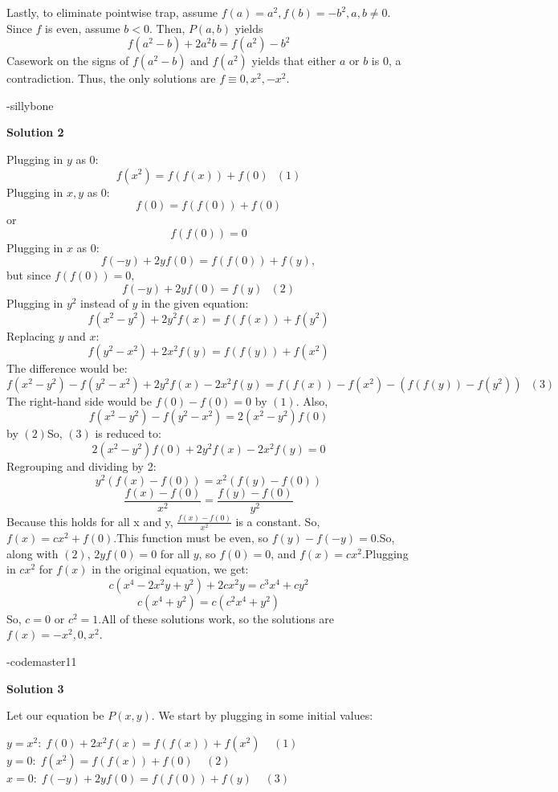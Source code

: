 \begin{enumerate}
 Lastly, to eliminate pointwise trap, assume $f(a)=a^2, f(b)=-b^2, a, b \neq  0$. Since $f$ is even, assume $b< 0$. Then, $P(a, b)$ yields 
 \[f(a^2-b)+2a^2b=f(a^2)-b^2\] Casework on the signs of $f(a^2-b)$ and $f(a^2)$ yields that either $a$ or $b$ is 0, a contradiction. Thus, the only solutions are $\boxed{f\equiv 0, x^2, -x^2}$.

 -sillybone

 



\textbf{Solution 2}

Plugging in $y$ as $0:$\begin{equation}f(x^2)=f(f(x))+f(0) \text{ } (1)\end{equation}Plugging in $x, y$ as $0:$
 \[f(0)=f(f(0))+f(0)\]or
 \[f(f(0))=0\]Plugging in $x$ as $0:$
 \[f(-y)+2yf(0)=f(f(0))+f(y),\]but since $f(f(0))=0,$\begin{equation}f(-y)+2yf(0)=f(y) \text{ } (2)\end{equation}Plugging in $y^2$ instead of $y$ in the given equation:
 \[f(x^2-y^2)+2y^2f(x)=f(f(x))+f(y^2)\]Replacing $y$ and $x$:
 \[f(y^2-x^2)+2x^2f(y)=f(f(y))+f(x^2)\]The difference would be:\begin{equation}f(x^2-y^2)-f(y^2-x^2)+2y^2f(x)-2x^2f(y)=f(f(x))-f(x^2)-(f(f(y))-f(y^2)) \text{ } (3)\end{equation}The right-hand side would be $f(0)-f(0)=0$ by $(1).$ Also,
 \[f(x^2-y^2)-f(y^2-x^2)=2(x^2-y^2)f(0)\] by $(2)$So, $(3)$ is reduced to:
 \[2(x^2-y^2)f(0)+2y^2f(x)-2x^2f(y)=0\]Regrouping and dividing by 2:
 \[y^2(f(x)-f(0))=x^2(f(y)-f(0))\]
 \[\frac{f(x)-f(0)}{x^2}=\frac{f(y)-f(0)}{y^2}\]Because this holds for all x and y, $\frac{f(x)-f(0)}{x^2}$ is a constant. So, $f(x)=cx^2+f(0)$.This function must be even, so $f(y)-f(-y)=0$.So, along with $(2)$, $2yf(0)=0$ for all $y$, so $f(0)=0$, and $f(x)=cx^2$.Plugging in $cx^2$ for $f(x)$ in the original equation, we get:
 \[c(x^4-2x^2y+y^2)+2cx^2y=c^3x^4+cy^2\]
 \[c(x^4+y^2)=c(c^2x^4+y^2)\]So, $c=0$ or $c^2=1.$All of these solutions work, so the solutions are $f(x)=-x^2, 0, x^2$.

 -codemaster11

 



\textbf{Solution 3}

Let our equation be $P(x,y)$. We start by plugging in some initial values:

 $y=x^2:\; f(0)+2x^2f(x) = f(f(x))+f(x^2) \;\;\;\; (1)$
$y=0:\; f(x^2) = f(f(x))+f(0) \;\;\;\; (2)$
$x=0:\; f(-y) + 2yf(0) = f(f(0)) + f(y) \;\;\;\; (3)$


\end{enumerate}
